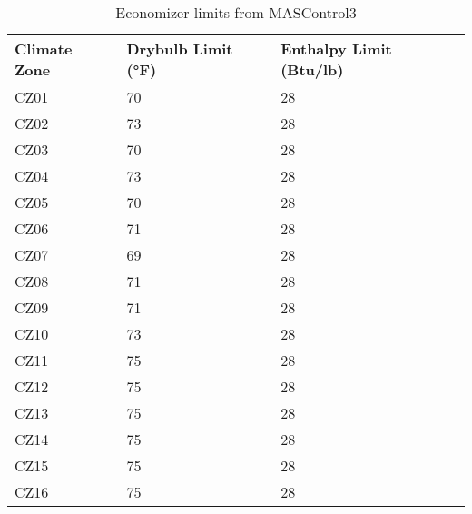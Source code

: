 \begin{table}[h!]
  \centering
  \small
  \caption[MASControl3 Economizer Limits]{Economizer limits from MASControl3}
  \label{tab:econ_lims_mascontrol3}
  \begin{tabular}{|p{0.75in}|p{1.25in}|p{1.5in}|}
  \hline
  \textbf{Climate Zone} &
  \textbf{Drybulb Limit (°F)} &
  \textbf{Enthalpy Limit (Btu/lb)} \\ \hline
  CZ01 & 70 & 28 \\ \hline
  CZ02 & 73 & 28 \\ \hline
  CZ03 & 70 & 28 \\ \hline
  CZ04 & 73 & 28 \\ \hline
  CZ05 & 70 & 28 \\ \hline
  CZ06 & 71 & 28 \\ \hline
  CZ07 & 69 & 28 \\ \hline
  CZ08 & 71 & 28 \\ \hline
  CZ09 & 71 & 28 \\ \hline
  CZ10 & 73 & 28 \\ \hline
  CZ11 & 75 & 28 \\ \hline
  CZ12 & 75 & 28 \\ \hline
  CZ13 & 75 & 28 \\ \hline
  CZ14 & 75 & 28 \\ \hline
  CZ15 & 75 & 28 \\ \hline
  CZ16 & 75 & 28 \\ \hline
  \end{tabular}
  \end{table}